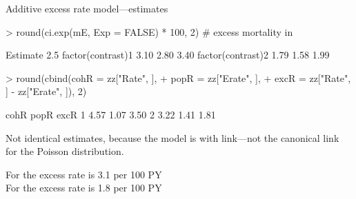 \begin{frame}[fragile]{Additive excess rate model---estimates}
\vspace*{-1ex}
\begin{Schunk}
\begin{Sinput}
> round(ci.exp(mE, Exp = FALSE) * 100, 2) # excess mortality in %
\end{Sinput}
\begin{Soutput}
                  Estimate 2.5%
factor(contrast)1     3.10 2.80  3.40
factor(contrast)2     1.79 1.58  1.99
\end{Soutput}
\begin{Sinput}
> round(cbind(cohR = zz["Rate", ],
+             popR = zz["Erate", ],
+             excR = zz["Rate", ] - zz["Erate", ]), 2)
\end{Sinput}
\begin{Soutput}
  cohR popR excR
1 4.57 1.07 3.50
2 3.22 1.41 1.81
\end{Soutput}
\end{Schunk}
Not identical estimates, because
the model is with  link---not the canonical link for the
Poisson distribution.

For  the excess rate is 3.1 per 100 PY\\
For  the excess rate is 1.8 per 100 PY

\end{frame}
